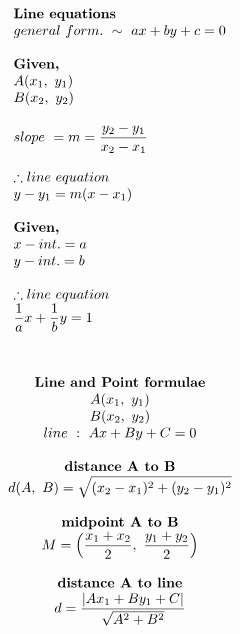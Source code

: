 \documentclass{article}
\begin{document}
\setlength{\columnsep}{2cm}
\begin{multicols}{2}
    \noindent 
    \[
    \begin{array}{>{\displaystyle}l}
        \textbf{Line\ equations}\\
        general\ form.\ \sim \ ax+by+c=0\\
        \\
        \textbf{Given,} \\
        A( x_{1} ,\ y_{1})\\
        B( x_{2} ,\ y_{2})\\
        \\
        slope\ =m=\frac{y_{2} -y_{1}}{x_{2} -x_{1}}\\
        \\
        \therefore line\ equation\ \\
        y-y_{1} =m( x-x_{1})\\
        \\
        \textbf{Given,} \\
        x-int.=a\\
        y-int.=b\\
        \\
        \therefore line\ equation\ \\
        \frac{1}{a} x+\frac{1}{b} y=1\\
    \end{array}
    \]
    \columnbreak
    \noindent 
    \[
    \begin{array}{>{\displaystyle}c}
        \\
        \\
        \centerline{$\textbf{Line\ and\ Point\ formulae}$} \\
        \centerline{$A( x_{1} ,\ y_{1})$}\\
        \centerline{$B( x_{2} ,\ y_{2})$}\\
        \centerline{$line\ :\ Ax+By+C=0$}\\
        \\
        \textbf{distance\ A\ to\ B}\\
        d( A,\ B) =\sqrt{( x_{2} -x_{1})^{2} +( y_{2} -y_{1})^{2}}\\
        \\
        \textbf{midpoint\ A\ to\ B} \\
        M=\left(\frac{x_{1} +x_{2}}{2} ,\ \frac{y_{1} +y_{2}}{2}\right)\\
        \\
        \textbf{distance\ A\ to\ line} \\
        d=\frac{|Ax_{1} +By_{1} +C|}{\sqrt{A^{2} +B^{2}}}
    \end{array}
    \]
\end{multicols}
\end{document}

